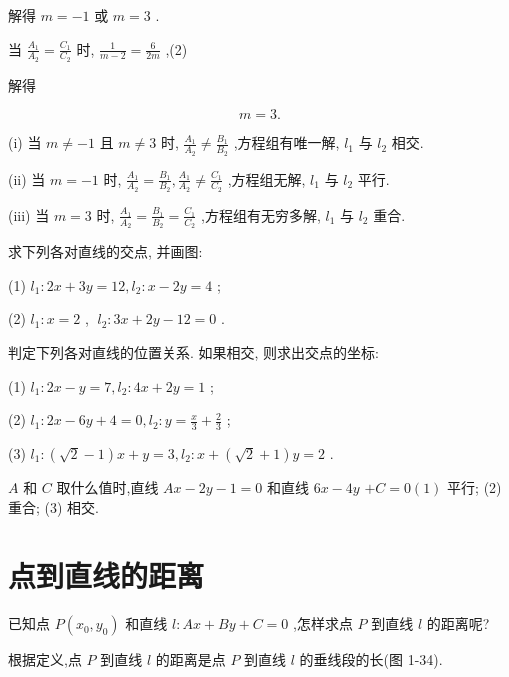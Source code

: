\documentclass[lang=cn,newtx,10pt,scheme=chinese]{elegantbook}
\begin{document}
解得 \(m = - 1\) 或 \(m = 3\) .

当 \(\frac{{A}_{1}}{{A}_{2}} = \frac{{C}_{1}}{{C}_{2}}\) 时, \(\frac{1}{m - 2} = \frac{6}{2m}\) ,(2)

解得

\[
  m = 3\text{.}
\]

(i) 当 \(m \neq - 1\) 且 \(m \neq 3\) 时, \(\frac{{A}_{1}}{{A}_{2}} \neq \frac{{B}_{1}}{{B}_{2}}\) ,方程组有唯一解, \({l}_{1}\) 与 \({l}_{2}\) 相交.

(ii) 当 \(m = - 1\) 时, \(\frac{{A}_{1}}{{A}_{2}} = \frac{{B}_{1}}{{B}_{2}},\frac{{A}_{1}}{{A}_{2}} \neq \frac{{C}_{1}}{{C}_{2}}\) ,方程组无解, \({l}_{1}\) 与 \({l}_{2}\) 平行.

(iii) 当 \(m = 3\) 时, \(\frac{{A}_{1}}{{A}_{2}} = \frac{{B}_{1}}{{B}_{2}} = \frac{{C}_{1}}{{C}_{2}}\) ,方程组有无穷多解, \({l}_{1}\) 与 \({l}_{2}\) 重合.

\begin{problemset}[练习]

\item 求下列各对直线的交点, 并画图:

(1) \({l}_{1} : {2x} + {3y} = {12},{l}_{2} : x - {2y} = 4\) ;

(2) \({l}_{1} : x = 2\) , \(\;{l}_{2} : {3x} + {2y} - {12} = 0\) .

\item 判定下列各对直线的位置关系. 如果相交, 则求出交点的坐标:

(1) \({l}_{1} : {2x} - y = 7,{l}_{2} : {4x} + {2y} = 1\) ;

(2) \({l}_{1} : {2x} - {6y} + 4 = 0,{l}_{2} : y = \frac{x}{3} + \frac{2}{3}\) ;

(3) \({l}_{1} : \left( {\sqrt{2} - 1}\right) x + y = 3,{l}_{2} : x + \left( {\sqrt{2} + 1}\right) y = 2\) .

\item \(A\) 和 \(C\) 取什么值时,直线 \({Ax} - {2y} - 1 = 0\) 和直线 \({6x} - {4y}\) \(+ C = 0\left( 1\right)\) 平行; (2) 重合; (3) 相交.

\end{problemset}

\section{点到直线的距离}

已知点 \(P\left( {{x}_{0},{y}_{0}}\right)\) 和直线 \(l : {Ax} + {By} + C = 0\) ,怎样求点 \(P\) 到直线 \(l\) 的距离呢?

根据定义,点 \(P\) 到直线 \(l\) 的距离是点 \(P\) 到直线 \(l\) 的垂线段的长(图 1-34).
\end{document}
